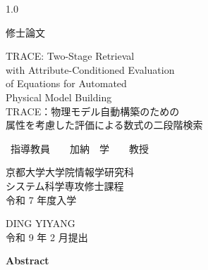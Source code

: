 \documentclass[uplatex,a4j,onecolumn,11pt,openany,english,oneside]{jsbook}
\newcommand{\PaperSectioning}{\let\subsection\section \let\section\chapter}
\begin{document}
\thispagestyle{empty}
\begin{spacing}{1.0}
\begin{center}
\vspace*{3mm}
{\huge  修士論文}
\vspace{10mm}

{\huge TRACE: Two-Stage Retrieval\\ with Attribute-Conditioned Evaluation\\ of Equations for Automated\\ Physical Model Building\\}
\vspace{5mm}
{\LARGE TRACE：物理モデル自動構築のための\\
\vspace{5mm}
属性を考慮した評価による数式の二段階検索}

\vspace{12mm}

{\huge ~指導教員　　加納　学　　教授}\\
\vspace{3mm}
\vspace{12mm}

{\huge 京都大学大学院情報学研究科}\\
\vspace{3mm}
{\huge システム科学専攻修士課程}\\
\vspace{3mm}
{\huge 令和 7 年度入学}\\
\vspace{30mm}

{\huge DING YIYANG}\\
\vspace{12mm}
{\huge 令和 9 年 2 月提出}
\end{center}
\end{spacing}

\newpage
\thispagestyle{empty}
{\huge \bf Abstract}
\\
\\
\\
\\
\\


\newpage
\setcounter{tocdepth}{1}   %
\tableofcontents
\thispagestyle{empty}
\newpage
{}

\begingroup
\PaperSectioning









\label{thesis:endbody}
\endgroup
\end{document}
